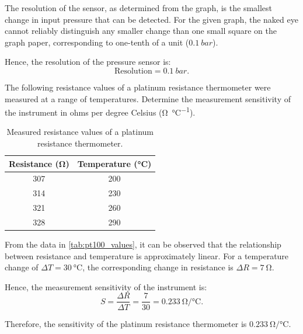 
\begin{solutionblock}
The resolution of the sensor, as determined from the graph, is the smallest change in input 
pressure that can be detected. For the given graph, the naked eye cannot reliably distinguish 
any smaller change than one small square on the graph paper, corresponding to one-tenth of a unit 
($0.1~\si{bar}$). 

Hence, the resolution of the pressure sensor is:
\begin{equation}
    \text{Resolution} = \SI{0.1}{bar}.
\end{equation}
\end{solutionblock}




The following resistance values of a platinum resistance thermometer were measured at a range of temperatures. 
Determine the measurement sensitivity of the instrument in ohms per degree Celsius (\si{\ohm\per\celsius}).

\begin{table}[htbp]
    \centering
    \caption{Measured resistance values of a platinum resistance thermometer.}
    \begin{tabular}{cc}
        \toprule
        \textbf{Resistance (\si{\ohm})} & \textbf{Temperature (\si{\celsius})} \\
        \midrule
        307 & 200 \\
        314 & 230 \\
        321 & 260 \\
        328 & 290 \\
        \bottomrule
    \end{tabular}
    \label{tab:pt100_values}
\end{table}


\begin{solutionblock}
From the data in \autoref{tab:pt100_values}, it can be observed that the relationship between 
resistance and temperature is approximately linear. For a temperature change of 
$\Delta T = 30~\si{\celsius}$, the corresponding change in resistance is 
$\Delta R = 7~\si{\ohm}$.

Hence, the measurement sensitivity of the instrument is:
\begin{equation}
    S = \frac{\Delta R}{\Delta T} = \frac{7}{30} = 0.233~\si{\ohm\per\celsius}.
\end{equation}

Therefore, the sensitivity of the platinum resistance thermometer is 
$\SI{0.233}{\ohm\per\celsius}$.
\end{solutionblock}


